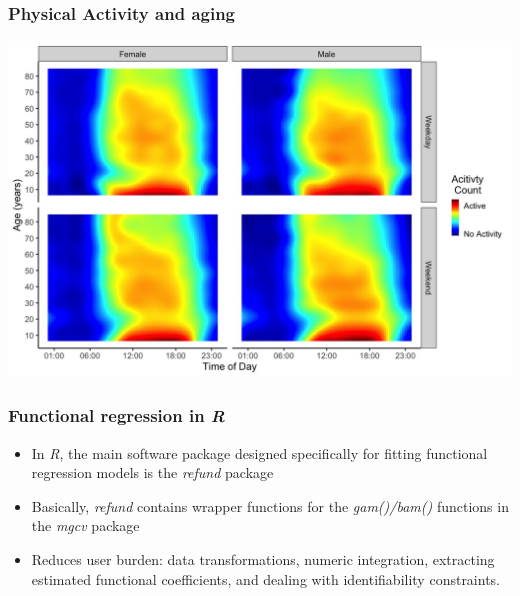 \documentclass[10pt]{beamer}\usepackage[]{graphicx}\usepackage[]{color}
\begin{document}
\begin{frame}
\frametitle{Physical Activity and aging}
\centering
\includegraphics[width=\textwidth]{PA_profiles_by_age_by_wknd}
\end{frame}






\begin{frame}
\frametitle{Functional regression in {\it R}}
\begin{itemize}
\item In {\it R}, the main software package designed specifically for fitting functional regression models is the {\it refund} package\footnotemark
\item Basically, {\it refund} contains wrapper functions for the {\it gam()/bam()} functions in the {\it mgcv} package\footnotemark\footnotemark
\item Reduces user burden: data transformations, numeric integration, extracting estimated functional coefficients, and dealing with identifiability constraints.
\end{itemize}



\end{frame}
\end{document}

